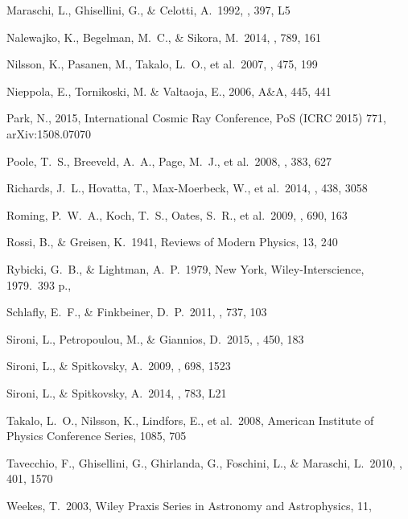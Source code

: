 \documentclass[twocolumn]{aastex6}
\begin{document}
\begin{thebibliography}{99}
 Maraschi, L., 
Ghisellini, G., \& Celotti, A.\ 1992, \apjl, 397, L5 

 Nalewajko, K., 
Begelman, M.~C., \& Sikora, M.\ 2014, \apj, 789, 161 

 Nilsson, K., Pasanen, M., Takalo, L.~O., et al.\ 2007, \aap, 475, 199 

 Nieppola, E., Tornikoski, M. \& Valtaoja, E., 2006, A\&A, 445, 441

 Park, N., 2015, International 
Cosmic Ray Conference, PoS (ICRC 2015) 771, arXiv:1508.07070 

 Poole, T.~S., Breeveld, 
A.~A., Page, M.~J., et al.\ 2008, \mnras, 383, 627 

 Richards, J.~L., 
Hovatta, T., Max-Moerbeck, W., et al.\ 2014, \mnras, 438, 3058 

 Roming, P.~W.~A., Koch, 
T.~S., Oates, S.~R., et al.\ 2009, \apj, 690, 163 

 Rossi, B., \& Greisen, K.\ 1941, Reviews of Modern Physics, 13, 240 

 Rybicki, G.~B., \& Lightman, A.~P.\ 1979, New York, Wiley-Interscience, 1979.~393 p.,  

 Schlafly, E.~F., \& Finkbeiner, D.~P.\ 2011, \apj, 737, 103 

 Sironi, L., Petropoulou, 
M., \& Giannios, D.\ 2015, \mnras, 450, 183 

 Sironi, L., \& Spitkovsky, A.\ 2009, \apj, 698, 1523 

 Sironi, L., \& Spitkovsky, A.\ 2014, \apjl, 783, L21 

 Takalo, L.~O., Nilsson, K., Lindfors, E., et al.\ 2008, American Institute of Physics Conference Series, 1085, 705 

 Tavecchio, F., Ghisellini, G., Ghirlanda, G., Foschini, L., \& Maraschi, L.\ 2010, \mnras, 401, 1570 

 Weekes, T.\ 2003, Wiley Praxis Series in Astronomy and Astrophysics, 11,  

\end{thebibliography}
\end{document}
